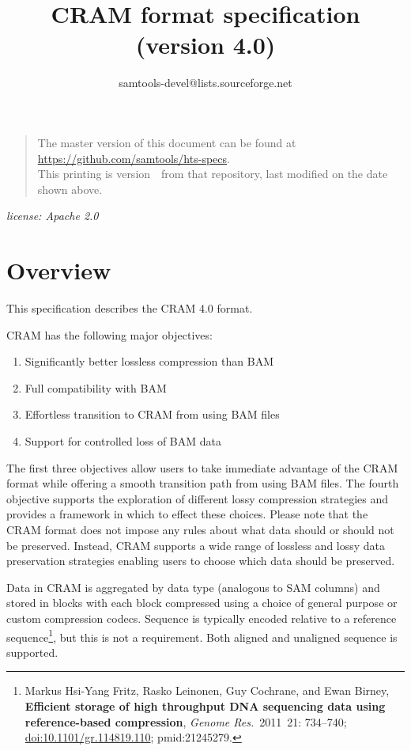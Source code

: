\documentclass[a4paper]{article}
\begin{document}

\title{CRAM format specification (version 4.0)}
\author{samtools-devel@lists.sourceforge.net}
\date{\headdate}
\maketitle


\begin{quote}\small
The master version of this document can be found at
\url{https://github.com/samtools/hts-specs}.\\
This printing is version~\commitdesc\ from that repository,
last modified on the date shown above.
\end{quote}

\begin{center}
\textit{license: Apache 2.0}
\end{center}
\vspace*{1em}

\section{\textbf{Overview}}

This specification describes the CRAM 4.0 format. 

CRAM has the following major objectives:

\begin{enumerate}
\item Significantly better lossless compression than BAM

\item Full compatibility with BAM

\item Effortless transition to CRAM from using BAM files

\item Support for controlled loss of BAM data
\end{enumerate}

The first three objectives allow users to take immediate advantage of the CRAM 
format while offering a smooth transition path from using BAM files. The fourth 
objective supports the exploration of different lossy compression strategies and 
provides a framework in which to effect these choices. Please note that the CRAM 
format does not impose any rules about what data should or should not be preserved. 
Instead, CRAM supports a wide range of lossless and lossy data preservation strategies 
enabling users to choose which data should be preserved.

Data in CRAM is aggregated by data type (analogous to SAM columns) and
stored in blocks with each block compressed using a choice of general
purpose or custom compression codecs.  Sequence is typically encoded
relative to a reference sequence\footnote{Markus Hsi-Yang Fritz,
Rasko Leinonen, Guy Cochrane, and Ewan Birney,
\textbf{Efficient storage of high throughput DNA sequencing data using reference-based compression},
{\sl Genome Res.}~2011~21: 734--740;
\href{http://dx.doi.org/doi:10.1101/gr.114819.110}{doi:10.1101/gr.114819.110};
{\sc pmid:}21245279.}, but this is not a requirement.  Both
aligned and unaligned sequence is supported.
\end{document}
